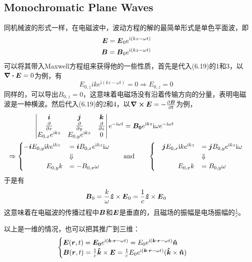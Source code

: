 \documentclass[14pt,oneside]{book}
\def \i{\mathrm{i}}
\def \E{\vb*{E}}
\def \B{\vb*{B}}
\begin{document}
\begin{large}
\subsection{Monochromatic Plane Waves}
同机械波的形式一样，在电磁波中，波动方程的解的最简单形式是单色平面波，即
\begin{align}
	    \vb*{E}=\vb*{E}_0e^{\i(kz-\omega t)}\\
  \B=\B_0e^{\i(kz-\omega t)}	\notag
\end{align}
可以将其带入Maxwell方程组来获得他的一些性质，首先是代入(6.19)的1和3，以$\div{\E}=0$为例，有
\begin{equation}
  E_{0,z}ike^{\i(kz-\omega t)}=0\Rightarrow E_{0,z}=0
\end{equation}
同样的，可以导出$B_{0,z}=0$，这意味着电磁场没有沿着传输方向的分量，表明电磁波是一种横波。然后代入(6.19)的2和4，以$\curl{\vb*{E}}=-\pdv{\vb*{B}}{t}$为例，
\begin{equation}
\begin{aligned}
	  \mdet{\vb*{i} &\vb*{j}& \vb*{k}\\ \pdv{}{x} &\pdv{}{y} &\pdv{}{z}\\E_{0,x}e^{\i kz}&E_{0,y}e^{\i kz}&0}e^{-\i\omega t}&=\vb*{B_0}e^{\i kz}\i\omega e^{-\i \omega t}\\
	  \Rightarrow
	  \begin{cases}
	  -\vb*{i}E_{0,y}\i ke^{\i kz}&=\vb*{i}B_{0,x}e^{\i kz}\i\omega \\
	  &\Downarrow\\
	  \qquad \quad \,\,E_{0,y}k&=-B_{0,x}\omega
	  \end{cases}\qquad &\mathrm{and}\qquad 
	  	  \begin{cases}
	  \quad\vb*{j}E_{0,x}\i ke^{\i kz}&=\vb*{j}B_{0,y}e^{\i kz}\i\omega \\
	  &\Downarrow\\
	  \qquad \quad \,\,E_{0,x}k&=B_{0,y}\omega
	  \end{cases}
\end{aligned}
\end{equation}
于是有
\begin{equation}
  \B_0=\frac{k}{\omega}\vb*{\hat z}\times \E_0=\frac{1}{c}\vb*{\hat z}\times \E_0
\end{equation}
这意味着在电磁波的传播过程中$\vb*{B}$和$\E$是垂直的，且磁场的振幅是电场振幅的$\frac{1}{c}$。

以上是一维的情况，也可以把其推广到三维：
\begin{align}
	\begin{cases}
		\E(\vb*{r},t)=\vb*{E_0}e^{\i(\vb*{k}\cdot \vb*{r}-\omega t)}={E_0}e^{\i(\vb*{k}\cdot \vb*{r}-\omega t)}\vb*{\hat n}\\
		\B(\vb*{r},t)=\frac{1}{c}\vb*{\hat k}\times \vb*{E}=\frac{1}{c}E_0e^{\i(\vb*{k}\cdot \vb*{r}-\omega t)}(\vb*{\hat k}\times \vb*{\hat n})
	\end{cases}
\end{align}


\end{large}
\end{document}
